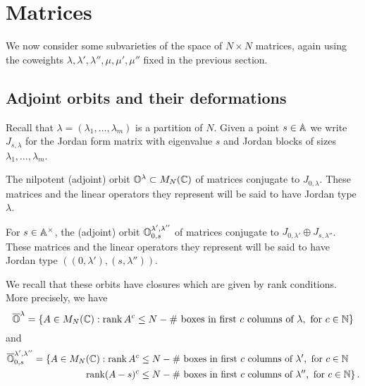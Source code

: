 \documentclass{article}
\begin{document}
\section{Matrices}\label{s:mats}
% 
We now consider some subvarieties of the space of $ N\times N$ matrices, again using the coweights $ \lambda, \lambda', \lambda'', \mu, \mu', \mu''$ fixed in the previous section. 

\subsection{Adjoint orbits and their deformations}\label{ss:familiesofadjointorbits}
% 
Recall that $\lambda=(\lambda_1,\dots,\lambda_m)$ is a partition of $ N$.
% 
Given a point $ s \in \AA$ we write $ J_{s,\lambda}$ for the Jordan form matrix with eigenvalue $ s$ and Jordan blocks of sizes $ \lambda_1, \dots, \lambda_m$.
    
\begin{definition}\label{def:Olam}
The nilpotent (adjoint) orbit $ \OO^\lambda \subset M_N(\CC)$ of matrices conjugate to $ J_{0,\lambda}$. These matrices and the linear operators they represent will be said to have Jordan type $\lambda$.
\end{definition}  
% 
\begin{definition}\label{def:Olamlam}
    For $ s \in \Ax$, the (adjoint) orbit $ \OO^{\lambda', \lambda''}_{0,s}$ of matrices conjugate to $ J_{0,\lambda'} \oplus J_{s,\lambda''}$.
    These matrices and the linear operators they represent will be said to have Jordan type $((0,\lambda'), (s,\lambda''))$.
\end{definition}  
% 
     
We recall that these orbits have closures which are given by rank conditions.  
More precisely, we have
$$
    \overline{\OO}^\lambda = \{ A \in M_N(\CC) : \rk A^c \le N - \#\text{~boxes in first $c$ columns of }\lambda,  \text{ for $ c \in \NN$} \}
$$
and
\begin{equation}\label{eq:ranks}
\begin{split}
    \overline{\OO}^{\lambda', \lambda''}_{0,s} = \{ A \in M_N(\CC) : \rk A^c &\le N - 
    \#\text{~boxes in first $c$ columns of }\lambda',  \text{ for $ c \in \NN$} \\
    \rk (A-s)^c &\le N - \#\text{~boxes in first $c$ columns of }\lambda'',  \text{ for $ c \in \NN$} \}\,. 
\end{split}
\end{equation}
%  
\end{document}
